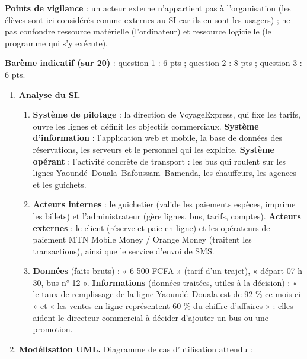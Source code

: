 \documentclass[11pt]{article}
\begin{document}
\begin{corrige}
\begin{enumerate}
\end{enumerate}
\textbf{Points de vigilance} : un acteur externe n'appartient pas à l'organisation (les élèves sont ici considérés comme externes au SI car ils en sont les usagers) ; ne pas confondre ressource matérielle (l'ordinateur) et ressource logicielle (le programme qui s'y exécute).
\end{corrige}

\begin{corrige}
\textbf{Barème indicatif (sur 20)} : question 1 : 6 pts ; question 2 : 8 pts ; question 3 : 6 pts.

\begin{enumerate}
    \item \textbf{Analyse du SI.}
    \begin{enumerate}
        \item \textbf{Système de pilotage} : la direction de VoyageExpress, qui fixe les tarifs, ouvre les lignes et définit les objectifs commerciaux. \textbf{Système d'information} : l'application web et mobile, la base de données des réservations, les serveurs et le personnel qui les exploite. \textbf{Système opérant} : l'activité concrète de transport : les bus qui roulent sur les lignes Yaoundé--Douala--Bafoussam--Bamenda, les chauffeurs, les agences et les guichets.
        \item \textbf{Acteurs internes} : le guichetier (valide les paiements espèces, imprime les billets) et l'administrateur (gère lignes, bus, tarifs, comptes). \textbf{Acteurs externes} : le client (réserve et paie en ligne) et les opérateurs de paiement MTN Mobile Money / Orange Money (traitent les transactions), ainsi que le service d'envoi de SMS.
        \item \textbf{Données} (faits bruts) : « 6 500 FCFA » (tarif d'un trajet), « départ 07 h 30, bus n° 12 ». \textbf{Informations} (données traitées, utiles à la décision) : « le taux de remplissage de la ligne Yaoundé--Douala est de 92 \% ce mois-ci » et « les ventes en ligne représentent 60 \% du chiffre d'affaires » : elles aident le directeur commercial à décider d'ajouter un bus ou une promotion.
    \end{enumerate}
    \item \textbf{Modélisation UML.} Diagramme de cas d'utilisation attendu :
\begin{popfigure}
\end{popfigure}
\end{enumerate}
\end{corrige}
\end{document}
